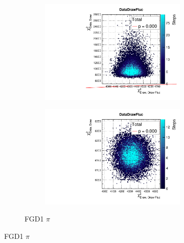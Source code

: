 \begin{figure}[h]
\begin{subfigure}[t]{\textwidth}
\begin{subfigure}[t]{0.24\textwidth}
			\includegraphics[width=\textwidth, trim={0mm 0mm 0mm 8mm}, clip,page=65]{figures/mach3/2018/data/2018a_FixedCov_RedCov_Mpi_Data_merge_PriorPred_procs}
		\end{subfigure}
		\begin{subfigure}[t]{0.24\textwidth}
			\includegraphics[width=\textwidth, trim={0mm 0mm 0mm 8mm}, clip,page=65]{figures/mach3/2018/data/2018a_FixedCov_RedCov_Mpi_Data_merge_PostPredStore_FullLLH_procs}
		\end{subfigure}
		\caption{FGD1 $\pi$}
	\end{subfigure}
	

\end{figure}
